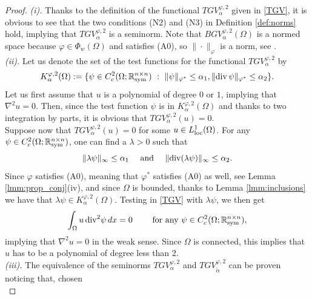 \documentclass[a4paper,11pt,oneside,notitlepage]{article}
\numberwithin{equation}{section}
\def\R{\mathbb{R}}
\def\loc{{\rm loc}}
\def\sym{{\rm sym}}
\renewcommand{\div}{\mathrm{div}}
\newcommand{\vphi}{\varphi}
\newcommand{\st}{ \ : \ }
\begin{document}
\begin{proof}
    {\it (i).} Thanks to the definition of the functional $TGV^{\vphi,2}_\alpha$ given in \eqref{TGV}, it is obvious to see that the two conditions (N2) and (N3) in Definition \ref{def:norms} hold, implying that $TGV^{\vphi,2}_\alpha$ is a seminorm. Note that $BGV^{\vphi,2}_\alpha(\Omega)$ is a normed space because $\vphi \in \Phi_w(\Omega)$ and satisfies (A0), so $\|\cdot\|_\vphi$ is a norm, see \cite[Theorem 3.7.13]{HaH}.
    \\
    {\it (ii).} Let us denote the set of the test functions for the functional $TGV^{\vphi,2}_\alpha$ by
    \begin{equation*}
        K^{\vphi,2}_\alpha(\Omega) := \{ \psi \in C^2_c (\Omega; \R^{n \times n}_\sym) \st \|\psi\|_{\vphi^*} \le \alpha_1, \|\div \, \psi\|_{\vphi^*} \le \alpha_2 \}.
    \end{equation*}
    Let us first assume that $u$ is a polynomial of degree $0$ or $1$, implying that $\nabla^2 u = 0$. Then, since the test function $\psi$ is in $K^{\vphi,2}_\alpha(\Omega)$ and thanks to two integration by parts, it is obvious that $TGV^{\vphi,2}_\alpha(u) = 0$.
    \\
    Suppose now that $TGV^{\vphi,2}_\alpha(u) = 0$ for some $u \in L^1_\loc(\Omega)$. For any $\psi \in C^2_c (\Omega; \R^{n \times n}_\sym)$, one can find a $\lambda > 0$ such that
    \begin{equation*}
        \|\lambda \psi\|_\infty \le \alpha_1 \quad \textnormal{ and } \quad \|\div (\lambda \psi)\|_\infty \le \alpha_2.
    \end{equation*}
    Since $\vphi$ satisfies (A0), meaning that $\vphi^*$ satisfies (A0) as well, see Lemma \ref{lmm:prop_conj}(iv), and since $\Omega$ is bounded, thanks to Lemma \ref{lmm:inclusions} we have that $\lambda\psi \in K^{\vphi,2}_\alpha(\Omega)$. Testing in \eqref{TGV} with $\lambda\psi$, we then get
    \begin{equation*}
        \int_\Omega u \,\div^2 \psi \, dx = 0 \qquad \textnormal{ for any } \psi \in C^2_c (\Omega; \R^{n \times n}_\sym),
    \end{equation*}
    implying that $\nabla^2 u = 0$ in the weak sense. Since $\Omega$ is connected, this implies that $u$ has to be a polynomial of degree less than $2$.
    \\
    {\it (iii).} The equivalence of the seminorms $TGV^{\vphi,2}_\alpha$ and $TGV^{\vphi,2}_{\tilde\alpha}$ can be proven noticing that, chosen
    \begin{equation*}

\end{equation*}
\end{proof}
\end{document}
